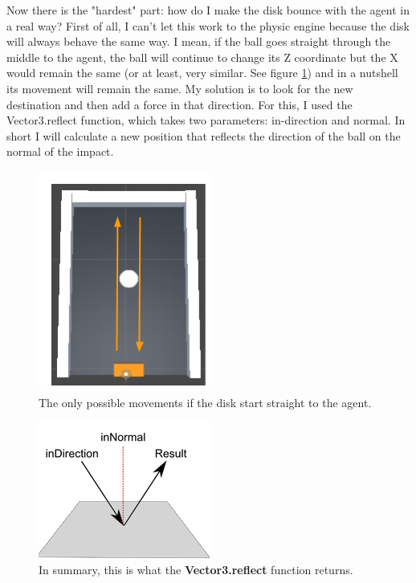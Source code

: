 \documentclass[12pt]{article}
\begin{document}
	\noindent
	Now there is the "hardest" part: how do I make the disk bounce with the agent in a real way?
	First of all, I can't let this work to the physic engine because the disk will always behave the same way. I mean, if the ball goes straight through the middle to the agent, the ball will continue to change its Z coordinate but the X would remain the same (or at least, very similar. See figure \ref{lbl:mvmupdown}) and in a nutshell its movement will remain the same.
	My solution is to look for the new destination and then add a force in that direction. For this, I used the Vector3.reflect function, which takes two parameters: in-direction and normal. In short I will calculate a new position that reflects the direction of the ball on the normal of the impact.
	
	\newpage
	
	\begin{figure}[hbt!]
		\centering
		\includegraphics[width= 0.4
		\textwidth]{images/FieldmovementUpDown.png}
		\caption{The only possible movements if the disk start straight to the agent.}
		\label{lbl:mvmupdown}
	\end{figure} 

	\begin{figure}[hbt!]
		\centering
		\includegraphics[width= 0.5
		\textwidth]{images/Reflect.png}
		\caption{In summary, this is what the \textbf{Vector3.reflect} function returns.}
		\label{lbl:reflect}
	\end{figure} 
	
\end{document}
